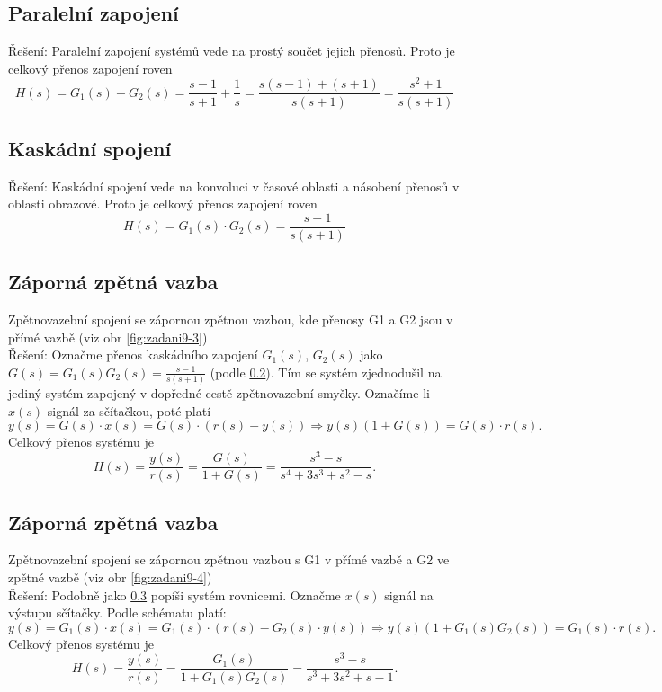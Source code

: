 \documentclass[twoside]{article}
\begin{document}
\subsection{Paralelní zapojení} 
Řešení: Paralelní zapojení systémů vede na prostý součet jejich přenosů. Proto je celkový přenos zapojení roven
\begin{equation*}
	H(s) = G_1(s) + G_2(s) = \frac{s-1}{s+1} + \frac{1}{s} = \frac{s(s-1) + (s+1)}{s(s+1)} = \frac{s^2 + 1}{s (s+1)}
\end{equation*}
\subsection{Kaskádní spojení}
\label{sec:ukol9:2}
Řešení: Kaskádní spojení vede na konvoluci v časové oblasti a násobení přenosů v oblasti obrazové. Proto je celkový přenos zapojení roven
\begin{equation*}
	H(s) = G_1(s) \cdot G_2(s) = \frac{s-1}{s(s+1)}
\end{equation*}
\subsection{Záporná zpětná vazba } 
\label{sec:ukol9:3}
Zpětnovazební spojení se zápornou zpětnou vazbou, kde přenosy G1 a G2 jsou v přímé vazbě (viz obr \ref{fig:zadani9-3}) \\
Řešení: Označme přenos kaskádního zapojení $G_1(s)$, $G_2(s)$ jako $G(s) = G_1(s)G_2(s) = \frac{s-1}{s(s+1)}$ (podle \ref{sec:ukol9:2}).
Tím se systém zjednodušil na jediný systém zapojený v dopředné cestě zpětnovazební smyčky. Označíme-li $x(s)$ signál za sčítačkou, poté platí
\begin{equation*}
	y(s) = G(s) \cdot x(s) = G(s) \cdot (r(s) - y(s)) \Rightarrow y(s) (1 + G(s)) = G(s) \cdot r(s).
\end{equation*}
Celkový přenos systému je
\begin{equation*}
	H(s) = \frac{y(s)}{r(s)} = \frac{G(s)}{1 + G(s)} = \frac{s^3 - s}{s^4 + 3s^3 + s^2 - s}.
\end{equation*}
\subsection{Záporná zpětná vazba } 
Zpětnovazební spojení se zápornou zpětnou vazbou s G1 v přímé vazbě a G2 ve zpětné vazbě (viz obr \ref{fig:zadani9-4}) \\
Řešení: Podobně jako \ref{sec:ukol9:3} popíši systém rovnicemi. Označme $x(s)$ signál na výstupu sčítačky. Podle schématu platí:
\begin{equation*}
	y(s) = G_1(s) \cdot x(s) = G_1(s) \cdot (r(s) - G_2(s) \cdot y(s)) \Rightarrow y(s) (1 + G_1(s)G_2(s)) = G_1(s) \cdot r(s).
\end{equation*}
Celkový přenos systému je
\begin{equation*}
	H(s) = \frac{y(s)}{r(s)} = \frac{G_1(s)}{1 + G_1(s)G_2(s)} = \frac{s^3 - s}{s^3 + 3s^2 +s - 1}.
\end{equation*}
\end{document}
